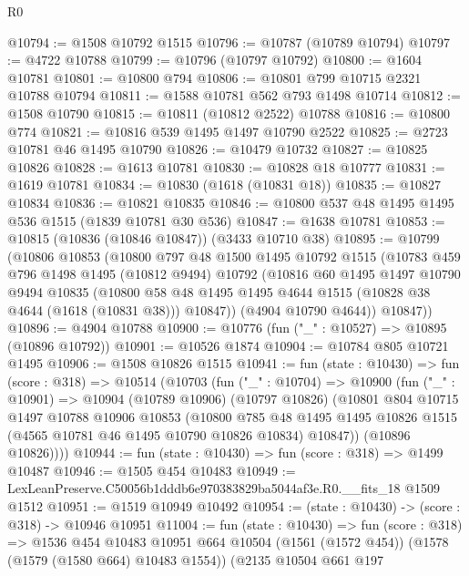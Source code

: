 \begin{lexlean}{R0}
\begin{coremodule}
@10794 := @1508 @10792 @1515
@10796 := @10787 (@10789 @10794)
@10797 := @4722 @10788
@10799 := @10796 (@10797 @10792)
@10800 := @1604 @10781
@10801 := @10800 @794
@10806 := @10801 @799 @10715 @2321 @10788 @10794
@10811 := @1588 @10781 @562 @793 @1498 @10714
@10812 := @1508 @10790
@10815 := @10811 (@10812 @2522) @10788
@10816 := @10800 @774
@10821 := @10816 @539 @1495 @1497 @10790 @2522
@10825 := @2723 @10781 @46 @1495 @10790
@10826 := @10479 @10732
@10827 := @10825 @10826
@10828 := @1613 @10781
@10830 := @10828 @18 @10777
@10831 := @1619 @10781
@10834 := @10830 (@1618 (@10831 @18))
@10835 := @10827 @10834
@10836 := @10821 @10835
@10846 := @10800 @537 @48 @1495 @1495 @536 @1515 (@1839 @10781 @30 @536)
@10847 := @1638 @10781
@10853 := @10815 (@10836 (@10846 @10847)) (@3433 @10710 @38)
@10895 := @10799
    (@10806
      @10853
      (@10800
        @797
        @48
        @1500
        @1495
        @10792
        @1515
        (@10783
          @459
          @796
          @1498
          @1495
          (@10812 @9494)
          @10792
          (@10816
            @60
            @1495
            @1497
            @10790
            @9494
            @10835
            (@10800 @58 @48 @1495 @1495 @4644 @1515 (@10828 @38 @4644 (@1618 (@10831 @38))) @10847))
          (@4904 @10790 @4644))
        @10847))
@10896 := @4904 @10788
@10900 := @10776 (fun ("_" : @10527) => @10895 (@10896 @10792))
@10901 := @10526 @1874
@10904 := @10784 @805 @10721 @1495
@10906 := @1508 @10826 @1515
@10941 := fun (state : @10430) =>
  fun (score : @318) =>
  @10514
    (@10703
      (fun ("_" : @10704) =>
      @10900
        (fun ("_" : @10901) =>
        @10904
          (@10789 @10906)
          (@10797 @10826)
          (@10801
            @804
            @10715
            @1497
            @10788
            @10906
            @10853
            (@10800
              @785
              @48
              @1495
              @1495
              @10826
              @1515
              (@4565 @10781 @46 @1495 @10790 @10826 @10834)
              @10847))
          (@10896 @10826))))
@10944 := fun (state : @10430) => fun (score : @318) => @1499 @10487
@10946 := @1505 @454 @10483
@10949 := LexLeanPreserve.C50056b1dddb6e970383829ba5044af3e.R0.__fits_18 @1509 @1512
@10951 := @1519 @10949 @10492
@10954 := (state : @10430) -> (score : @318) -> @10946 @10951
@11004 := fun (state : @10430) =>
  fun (score : @318) =>
  @1536
    @454
    @10483
    @10951
    @664
    @10504
    (@1561 (@1572 @454))
    (@1578 (@1579 (@1580 @664) @10483 @1554))
    (@2135
      @10504
      @661
      @197

\end{coremodule}
\end{lexlean}
